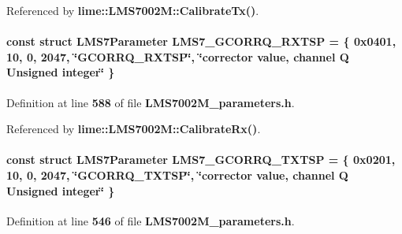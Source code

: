 Referenced by {\bf lime\+::\+L\+M\+S7002\+M\+::\+Calibrate\+Tx()}.

\paragraph[{L\+M\+S7\+\_\+\+G\+C\+O\+R\+R\+Q\+\_\+\+R\+X\+T\+SP}]{\setlength{\rightskip}{0pt plus 5cm}const struct {\bf L\+M\+S7\+Parameter} L\+M\+S7\+\_\+\+G\+C\+O\+R\+R\+Q\+\_\+\+R\+X\+T\+SP = \{ 0x0401, 10, 0, 2047, \char`\"{}\+G\+C\+O\+R\+R\+Q\+\_\+\+R\+X\+T\+S\+P\char`\"{}, \char`\"{}corrector value, channel Q Unsigned integer\char`\"{} \}\hspace{0.3cm}{\ttfamily [static]}}\label{LMS7002M__parameters_8h_ac0075073ae0965f00a0b84cff1b77fd5}


Definition at line {\bf 588} of file {\bf L\+M\+S7002\+M\+\_\+parameters.\+h}.



Referenced by {\bf lime\+::\+L\+M\+S7002\+M\+::\+Calibrate\+Rx()}.

\paragraph[{L\+M\+S7\+\_\+\+G\+C\+O\+R\+R\+Q\+\_\+\+T\+X\+T\+SP}]{\setlength{\rightskip}{0pt plus 5cm}const struct {\bf L\+M\+S7\+Parameter} L\+M\+S7\+\_\+\+G\+C\+O\+R\+R\+Q\+\_\+\+T\+X\+T\+SP = \{ 0x0201, 10, 0, 2047, \char`\"{}\+G\+C\+O\+R\+R\+Q\+\_\+\+T\+X\+T\+S\+P\char`\"{}, \char`\"{}corrector value, channel Q Unsigned integer\char`\"{} \}\hspace{0.3cm}{\ttfamily [static]}}\label{LMS7002M__parameters_8h_a0401435b58f217681c66c5abfa6a4d36}


Definition at line {\bf 546} of file {\bf L\+M\+S7002\+M\+\_\+parameters.\+h}.




